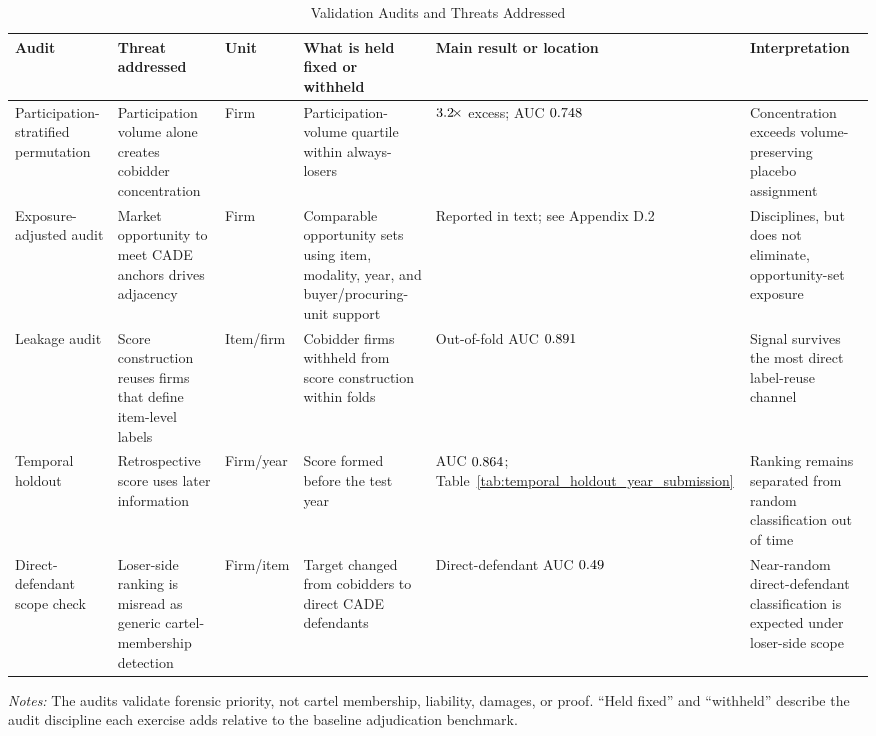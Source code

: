 \begin{table}[htbp]
\centering
\caption{Validation Audits and Threats Addressed}
\label{tab:validation_audit_map_submission}
\footnotesize
\begin{adjustbox}{max width=\textwidth,center}
\begin{threeparttable}
\begin{tabular}{L{3.2cm}L{3.7cm}L{2.4cm}L{3.8cm}L{3.2cm}L{3.7cm}}
\toprule
Audit & Threat addressed & Unit & What is held fixed or withheld & Main result or location & Interpretation \\
\midrule
Participation-stratified permutation &
Participation volume alone creates cobidder concentration &
Firm &
Participation-volume quartile within always-losers &
$3.2\!\times$ excess; AUC $0.748$ &
Concentration exceeds volume-preserving placebo assignment \\
Exposure-adjusted audit &
Market opportunity to meet CADE anchors drives adjacency &
Firm &
Comparable opportunity sets using item, modality, year, and buyer/procuring-unit support &
Reported in text; see Appendix D.2 &
Disciplines, but does not eliminate, opportunity-set exposure \\
Leakage audit &
Score construction reuses firms that define item-level labels &
Item/firm &
Cobidder firms withheld from score construction within folds &
Out-of-fold AUC $0.891$ &
Signal survives the most direct label-reuse channel \\
Temporal holdout &
Retrospective score uses later information &
Firm/year &
Score formed before the test year &
AUC $0.864$; Table~\ref{tab:temporal_holdout_year_submission} &
Ranking remains separated from random classification out of time \\
Direct-defendant scope check &
Loser-side ranking is misread as generic cartel-membership detection &
Firm/item &
Target changed from cobidders to direct CADE defendants &
Direct-defendant AUC $0.49$ &
Near-random direct-defendant classification is expected under loser-side scope \\
\bottomrule
\end{tabular}
\begin{tablenotes}
\footnotesize
\item \textit{Notes:} The audits validate forensic priority, not
cartel membership, liability, damages, or proof. ``Held fixed''
and ``withheld'' describe the audit discipline each exercise
adds relative to the baseline adjudication benchmark.
\end{tablenotes}
\end{threeparttable}
\end{adjustbox}
\end{table}


